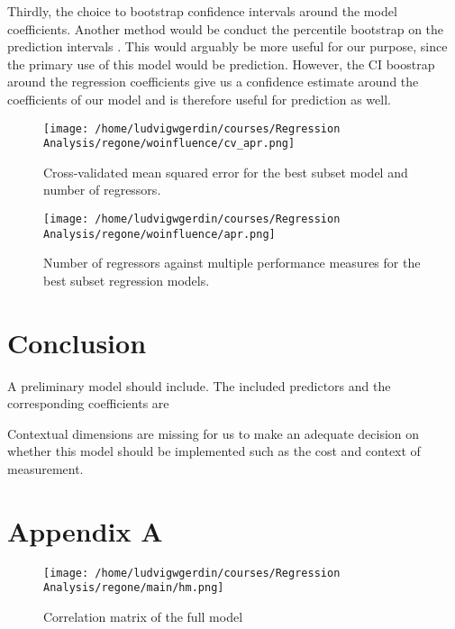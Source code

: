 \documentclass[11pt]{article}
\begin{document}
Thirdly, the choice to bootstrap confidence intervals around the model coefficients. Another method 
would be conduct the percentile bootstrap on the prediction intervals \cite{davison_hinkley_1997}. This 
would arguably be more useful for our purpose, since the primary use of this model would be prediction. 
However, the CI boostrap around the regression coefficients give us a confidence estimate around 
the coefficients of our model and is therefore useful for prediction as well.





\begin{figure}[htbp]
\centering
\texttt{[image: /home/ludvigwgerdin/courses/Regression Analysis/regone/woinfluence/cv\_apr.png]}
\caption{\label{fig:orge54577e}
Cross-validated mean squared error for the best subset model and number of regressors.}
\end{figure}

\begin{figure}[htbp]
\centering
\texttt{[image: /home/ludvigwgerdin/courses/Regression Analysis/regone/woinfluence/apr.png]}
\caption{\label{fig:org2297ae1}
Number of regressors against multiple performance measures for the best subset regression models.}
\end{figure}

\newpage
\section{Conclusion}
\label{sec:orgd613bc0}

A preliminary model should include. The included predictors and the corresponding coefficients are 

Contextual dimensions are missing for us to make an adequate decision on whether this model should be implemented
such as the cost and context of measurement.

\section{Appendix A}
\label{sec:org703fbd5}

\begin{figure}[H]
\centering
\texttt{[image: /home/ludvigwgerdin/courses/Regression Analysis/regone/main/hm.png]}
\caption{\label{fig:org48be7d5}
Correlation matrix of the full model}
\end{figure}
\end{document}
